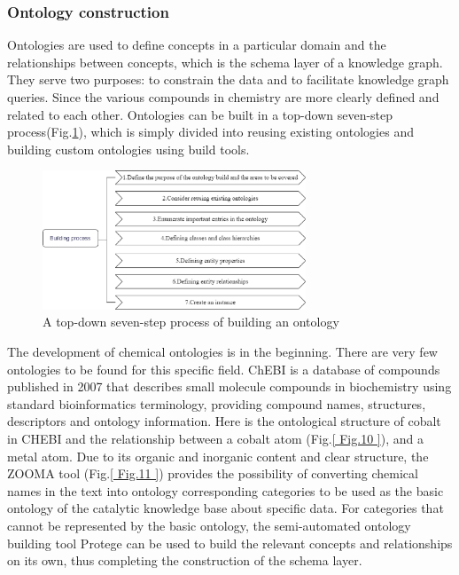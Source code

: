 \documentclass[%
 aip,
 jmp,%
 amsmath,amssymb,
 reprint,%
]{revtex4-2}
\begin{document}
\subsubsection{Ontology construction}
Ontologies are used to define concepts in a particular domain and the relationships between concepts, which is the schema layer of a knowledge graph. They serve two purposes: to constrain the data and to facilitate knowledge graph queries. Since the various compounds in chemistry are more clearly defined and related to each other.
Ontologies can be built in a top-down seven-step process(Fig.\ref{ Fig.9 }), which is simply divided into reusing existing ontologies and building custom ontologies using build tools\cite{subhashini2011survey}.

\begin{figure}[htbp]
 \centering
 \includegraphics[width=0.7\textwidth]{figure/9.png}
 \caption{ A top-down seven-step process of building an ontology }
 \label{ Fig.9 }
\end{figure}

The development of chemical ontologies is in the beginning. There are very few ontologies to be found for this specific field. ChEBI\cite{degtyarenko2007chebi} is a database of compounds published in 2007 that describes small molecule compounds in biochemistry using standard bioinformatics terminology, providing compound names, structures, descriptors and ontology information. Here is the ontological structure of cobalt in CHEBI and the relationship between a cobalt atom (Fig.\ref{ Fig.10 }), 
and a metal atom. Due to its organic and inorganic content and clear structure, the ZOOMA tool (Fig.\ref{ Fig.11 }) provides the possibility of converting chemical names in the text into ontology corresponding categories to be used as the basic ontology of the catalytic knowledge base about specific data. For categories that cannot be represented by the basic ontology, the semi-automated ontology building tool Protege\cite{musen2015protege} can be used to build the relevant concepts and relationships on its own, thus completing the construction of the schema layer.
\end{document}
